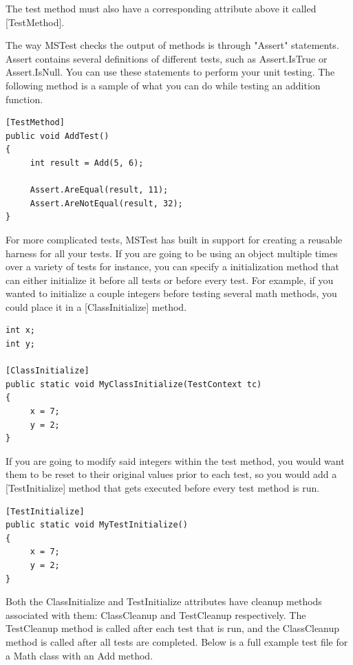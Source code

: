 The test method must also have a corresponding attribute above it called [TestMethod]. 

The way MSTest checks the output of methods is through "Assert" statements. Assert contains several definitions of different tests, such as Assert.IsTrue or Assert.IsNull. You can use these statements to perform your unit testing. The following method is a sample of what you can do while testing an addition function. 
\lstset{frame=shadowbox}
\begin{lstlisting}
[TestMethod]
public void AddTest()
{
     int result = Add(5, 6);
	
     Assert.AreEqual(result, 11);
     Assert.AreNotEqual(result, 32);
}  
\end{lstlisting}

For more complicated tests, MSTest has built in support for creating a reusable harness for all your tests. If you are going to be using an object multiple times over a variety of tests for instance, you can specify a initialization method that can either initialize it before all tests or before every test. For example, if you wanted to initialize a couple integers before testing several math methods, you could place it in a [ClassInitialize] method. 

\begin{lstlisting}
int x;
int y;
       
[ClassInitialize]
public static void MyClassInitialize(TestContext tc)
{
     x = 7;
     y = 2;
}
\end{lstlisting}

If you are going to modify said integers within the test method, you would want them to be reset to their original values prior to each test, so you would add a [TestInitialize] method that gets executed before every test method is run. 

\begin{lstlisting}
[TestInitialize]
public static void MyTestInitialize()
{
     x = 7;
     y = 2;
}
\end{lstlisting}

Both the ClassInitialize and TestInitialize attributes have cleanup methods associated with them: ClassCleanup and TestCleanup respectively. The TestCleanup method is called after each test that is run, and the ClassCleanup method is called after all tests are completed. Below is a full example test file for a Math class with an Add method. 

